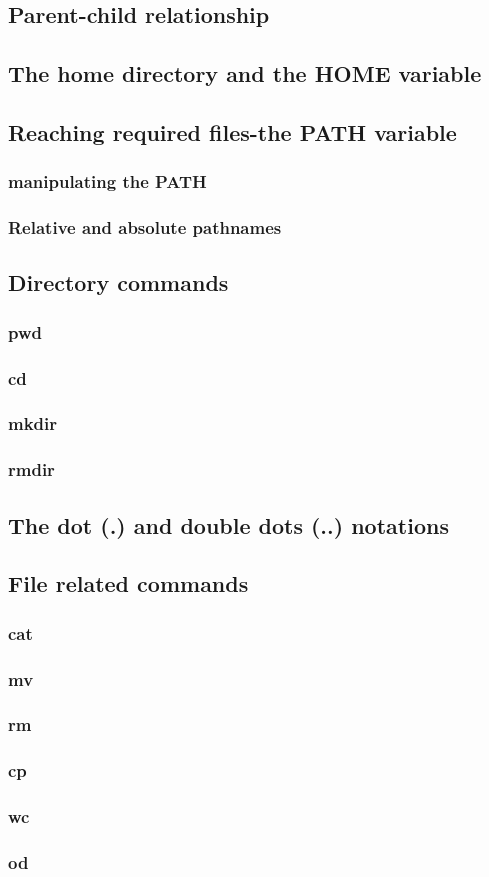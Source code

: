 \documentclass{article}
\begin{document}
	\subsection{Parent-child relationship}
	\subsection{The home directory and the HOME variable}
	\subsection{Reaching required files-the PATH variable}
	\subsubsection{manipulating the PATH}
	\subsubsection{Relative and absolute pathnames}
	\subsection{Directory commands}
	\subsubsection{pwd}
	\subsubsection{cd}
	\subsubsection{mkdir}
	\subsubsection{rmdir}
	\subsection{The dot (.) and double dots (..) notations}
	\subsection{File related commands}
	\subsubsection{cat}
	\subsubsection{mv}
	\subsubsection{rm}
	\subsubsection{cp}
	\subsubsection{wc}
	\subsubsection{od}
\end{document}
